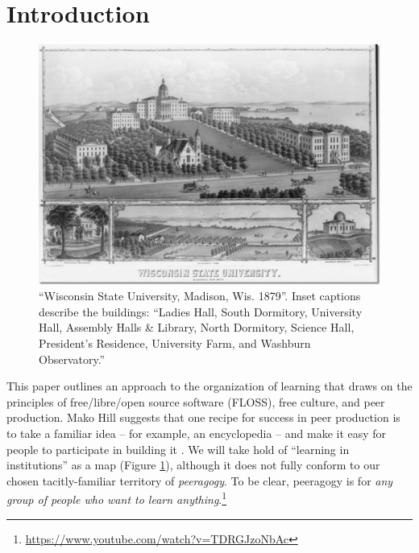 
\section*{Introduction}\label{sec:Introduction}

\begin{figure}
\vspace{-1.15cm}
\begin{center}
\includegraphics[width=.45\textwidth,trim=0 30 10 2, clip=true]{wisconsin-map}
\end{center}
\vspace{-.4cm}
\captionsetup{font=footnotesize,width=.52\textwidth}
\caption{``Wisconsin State
  University, Madison, Wis. 1879''.  Inset captions describe
  the buildings: ``Ladies Hall, South Dormitory, University
  Hall, Assembly Halls \& Library, North Dormitory, Science Hall,
  President's Residence, University Farm, and Washburn Observatory.''
\label{madison-map}}
\vspace{-1.5cm}
\end{figure}

This paper  outlines an approach to the organization of learning that draws on the principles of free\slash libre\slash open source software (FLOSS), free culture, and peer production.
Mako Hill suggests that one recipe for success in peer production is to take a familiar idea -- for example, an encyclopedia -- and make it easy for people to participate in building it \cite[Chapter 1]{mako-thesis}.  We will take hold of ``learning in institutions'' as a map (Figure \ref{madison-map}), although it does not fully conform to our chosen tacitly-familiar territory of \emph{peeragogy}.  To be clear, peeragogy is for \emph{any group of people who want to learn anything}.\footnote{\url{https://www.youtube.com/watch?v=TDRGJzoNbAc}}


